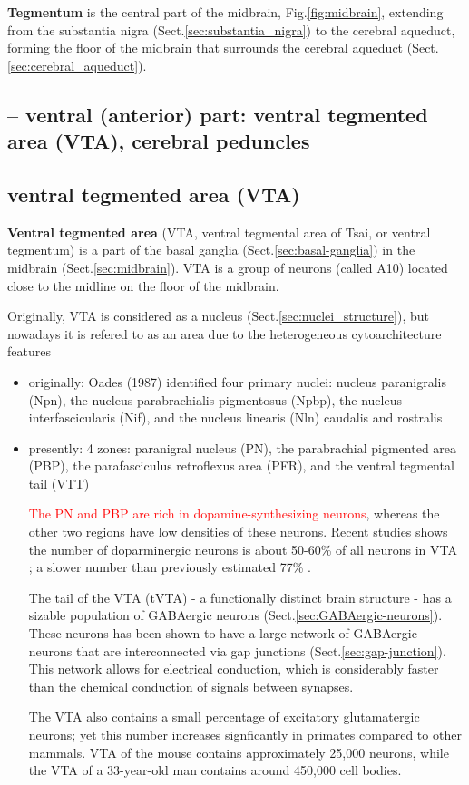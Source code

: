{\bf Tegmentum} is the central part of the midbrain, Fig.\ref{fig:midbrain},
extending from the substantia nigra (Sect.\ref{sec:substantia_nigra}) to the cerebral
aqueduct, forming the floor of the midbrain that surrounds the cerebral aqueduct
(Sect.\ref{sec:cerebral_aqueduct}).

\subsection{-- ventral (anterior) part: ventral tegmented area (VTA), cerebral
peduncles} 

  
\subsection{ventral tegmented area (VTA)}
\label{sec:ventral-tegmented-area}

{\bf Ventral tegmented area} (VTA,  ventral tegmental area of Tsai, or ventral
tegmentum) is a part of the basal ganglia (Sect.\ref{sec:basal-ganglia}) in the
midbrain (Sect.\ref{sec:midbrain}). VTA is a group of neurons (called A10)
located close to the midline on the floor of the midbrain.

Originally, VTA is considered as a nucleus (Sect.\ref{sec:nuclei_structure}),
but nowadays it is refered to as an area due to the heterogeneous
cytoarchitecture features
\begin{itemize}
  \item originally: Oades (1987) identified four primary nuclei: 
  nucleus paranigralis (Npn), the nucleus parabrachialis pigmentosus (Npbp), the
  nucleus interfascicularis (Nif), and the nucleus linearis (Nln) caudalis and rostralis
  
  \item presently: 4 zones:
  paranigral nucleus (PN), the parabrachial pigmented area (PBP), the
  parafasciculus retroflexus area (PFR), and the ventral tegmental tail (VTT)
  
  \textcolor{red}{The PN and PBP are rich in  dopamine-synthesizing neurons},
  whereas the other two regions have low densities of these neurons.
  Recent studies shows the number of doparminergic neurons is about 50-60\% of
  all neurons in VTA \citep{margolis2006}; a slower number than previously
  estimated 77\% \citep{johnson1992}.

  The tail of the VTA (tVTA) - a functionally distinct brain structure -  has a
sizable population of GABAergic neurons (Sect.\ref{sec:GABAergic-neurons}).
These neurons has been shown to have a large network of GABAergic neurons that
are interconnected via gap junctions (Sect.\ref{sec:gap-junction}). This network
allows for electrical conduction, which is considerably faster than the chemical
conduction of signals between synapses.

  The VTA also contains a small percentage of excitatory glutamatergic neurons;
  yet this number increases signficantly in primates compared to other mammals.
  VTA of the mouse contains approximately 25,000 neurons, while the VTA of a
  33-year-old man contains around 450,000 cell bodies.
\end{itemize}


